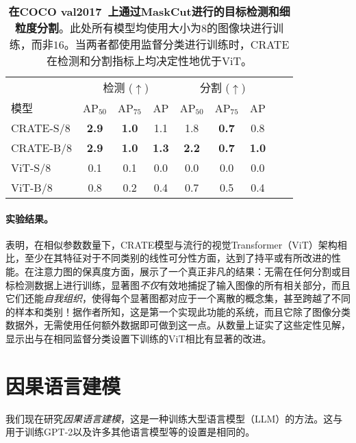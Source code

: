 \documentclass[../../book-main_zh.tex]{subfiles}
\begin{document}
\begin{table}
    \centering
    \begin{tabular}{@{}lcccccccc@{}}
    \toprule
     &  \multicolumn{3}{c}{检测 (\(\uparrow\))} &  \multicolumn{3}{c}{分割 (\(\uparrow\))} \\ 
    模型 & AP$_{50}$ & AP$_{75}$ & AP & AP$_{50}$ & AP$_{75}$ & AP  \\ 
    \midrule
    CRATE-S/8 & \textbf{2.9} & \textbf{1.0} & 1.1 & 1.8 & \textbf{0.7} & 0.8 \\
    CRATE-B/8 & \textbf{2.9} & \textbf{1.0} & \textbf{1.3} & \textbf{2.2} & \textbf{0.7} & \textbf{1.0} \\
    ViT-S/8 & 0.1& 0.1 & 0.0 & 0.0 & 0.0 & 0.0 \\
    ViT-B/8 & 0.8 & 0.2 & 0.4 & 0.7 & 0.5 & 0.4 \\
    \bottomrule
    \end{tabular}
    \caption{\small \textbf{在COCO {val2017}~\citep{lin2014microsoft}上通过MaskCut进行的目标检测和细粒度分割}。此处所有模型均使用大小为\(8\)的图像块进行训练，而非\(16\)。当两者都使用监督分类进行训练时，CRATE在检测和分割指标上均决定性地优于ViT。}
    \label{tab:crate_detection_segmentation}
\end{table}


\paragraph{实验结果。} 

表明，在相似参数数量下，CRATE模型与流行的视觉Transformer（ViT）架构相比，至少在其特征对于不同类别的线性可分性方面，达到了持平或有所改进的性能。在注意力图的保真度方面，展示了一个真正非凡的结果：无需在任何分割或目标检测数据上进行训练，显著图\textit{不仅}有效地捕捉了输入图像的所有相关部分，而且它们还能\textit{自我组织}，使得每个显著图都对应于一个离散的概念集，甚至跨越了不同的样本和类别！据作者所知，这是第一个实现此功能的系统，而且它除了图像分类数据外，无需使用任何额外数据即可做到这一点。从数量上证实了这些定性见解，显示出与在相同监督分类设置下训练的ViT相比有显著的改进。

\section{因果语言建模}\label{sec:clm_text}

我们现在研究\textit{因果语言建模}，这是一种训练大型语言模型（LLM）的方法。这与用于训练GPT-2以及许多其他语言模型等的设置是相同的。
\end{document}
